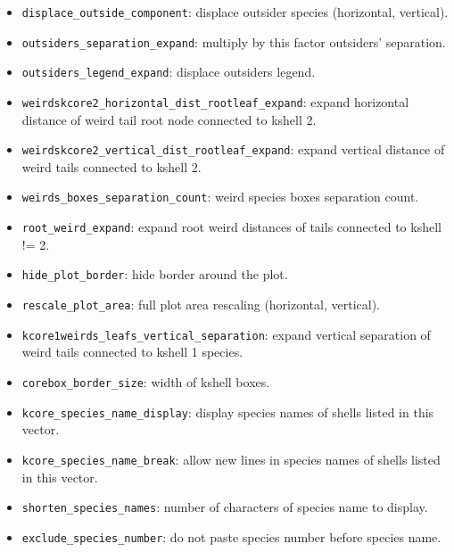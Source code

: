 \documentclass[11pt]{article}
\begin{document}
\begin{itemize}
\item \texttt{displace\_outside\_component}: displace outsider species (horizontal, vertical).

\item \texttt{outsiders\_separation\_expand}: multiply by this factor outsiders' separation.

\item \texttt{outsiders\_legend\_expand}: displace outsiders legend.

\item \texttt{weirdskcore2\_horizontal\_dist\_rootleaf\_expand}: expand horizontal distance of weird tail root node connected to kshell 2.

\item \texttt{weirdskcore2\_vertical\_dist\_rootleaf\_expand}: expand vertical distance of weird tails connected to kshell 2.

\item \texttt{weirds\_boxes\_separation\_count}: weird species boxes separation count.

\item \texttt{root\_weird\_expand}: expand root weird distances of tails connected to kshell != 2.

\item \texttt{hide\_plot\_border}: hide border around the plot.

\item \texttt{rescale\_plot\_area}: full plot area rescaling (horizontal, vertical).

\item \texttt{kcore1weirds\_leafs\_vertical\_separation}: expand vertical separation of weird tails connected to kshell 1 species.

\item \texttt{corebox\_border\_size}: width of kshell boxes.

\item \texttt{kcore\_species\_name\_display}: display species names of shells listed in this vector.

\item \texttt{kcore\_species\_name\_break}: allow new lines in species names of shells listed in this vector.

\item \texttt{shorten\_species\_names}: number of characters of species name to display.

\item \texttt{exclude\_species\_number}: do not paste species number before species name.


\end{itemize}
\end{document}
